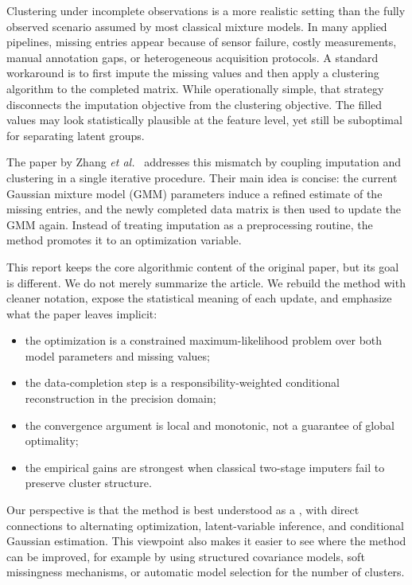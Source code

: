Clustering under incomplete observations is a more realistic setting than the fully observed scenario assumed by most classical mixture models. In many applied pipelines, missing entries appear because of sensor failure, costly measurements, manual annotation gaps, or heterogeneous acquisition protocols. A standard workaround is to first impute the missing values and then apply a clustering algorithm to the completed matrix. While operationally simple, that strategy disconnects the imputation objective from the clustering objective. The filled values may look statistically plausible at the feature level, yet still be suboptimal for separating latent groups.

The paper by Zhang \textit{et al.}~\cite{zhang2021gmm} addresses this mismatch by coupling imputation and clustering in a single iterative procedure. Their main idea is concise: the current Gaussian mixture model (GMM) parameters induce a refined estimate of the missing entries, and the newly completed data matrix is then used to update the GMM again. Instead of treating imputation as a preprocessing routine, the method promotes it to an optimization variable.

This report keeps the core algorithmic content of the original paper, but its goal is different. We do not merely summarize the article. We rebuild the method with cleaner notation, expose the statistical meaning of each update, and emphasize what the paper leaves implicit:
\begin{itemize}
    \item the optimization is a constrained maximum-likelihood problem over both model parameters and missing values;
    \item the data-completion step is a responsibility-weighted conditional reconstruction in the precision domain;
    \item the convergence argument is local and monotonic, not a guarantee of global optimality;
    \item the empirical gains are strongest when classical two-stage imputers fail to preserve cluster structure.
\end{itemize}

Our perspective is that the method is best understood as a , with direct connections to alternating optimization, latent-variable inference, and conditional Gaussian estimation. This viewpoint also makes it easier to see where the method can be improved, for example by using structured covariance models, soft missingness mechanisms, or automatic model selection for the number of clusters.
